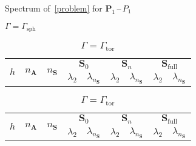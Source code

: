 \documentclass[12pt]{article}
\newcommand{\vect}[1]{\boldsymbol{\mathbf{#1}}}
\newcommand{\sphere}{{\Gamma_{\text{sph}}}}
\newcommand{\tor}{{\Gamma_{\text{tor}}}}
\begin{document}
\begin{table}[h]
	\centering\small
	\caption{Spectrum of~\eqref{problem} for $\vect P_1$\,--\,$P_1$} 
	\label{tab:p1p1}
	\begin{subtable}{1.\linewidth}
		\centering
		\caption{$\Gamma = \sphere$}
		\label{tab:p1p1:sph}
		\begin{tabular}[1.3]{|c|c|c|c|c|c|c|c|c|}
			\hline
			\multirow{2}{*}{$h$} & \multirow{2}{*}{$n_{\vect A}$} & \multirow{2}{*}{$n_{\vect S}$} & \multicolumn{2}{c|}{$\vect S_0$} & \multicolumn{2}{c|}{$\vect S_n$} & \multicolumn{2}{c|}{$\vect S_{\text{full}}$} \\ 
			\cline{4-9}
			& & & $\lambda_2$ & $\lambda_{n_{\vect S}}$ & $\lambda_2$ & $\lambda_{n_{\vect S}}$ & $\lambda_2$ & $\lambda_{n_{\vect S}}$ \\ 
			\hline
			
		\end{tabular}
	\end{subtable}%
	\vskip 3mm
	\begin{subtable}{1.\linewidth}
		\centering
		\caption{$\Gamma = \tor$}
		\label{tab:p1p1:tor}
		\begin{tabular}[1.3]{|c|c|c|c|c|c|c|c|c|}
			\hline
			\multirow{2}{*}{$h$} & \multirow{2}{*}{$n_{\vect A}$} & \multirow{2}{*}{$n_{\vect S}$} & \multicolumn{2}{c|}{$\vect S_0$} & \multicolumn{2}{c|}{$\vect S_n$} & \multicolumn{2}{c|}{$\vect S_{\text{full}}$} \\ 
			\cline{4-9}
			& & & $\lambda_2$ & $\lambda_{n_{\vect S}}$ & $\lambda_2$ & $\lambda_{n_{\vect S}}$ & $\lambda_2$ & $\lambda_{n_{\vect S}}$ \\ 
			\hline
			
		\end{tabular}
	\end{subtable}
\end{table}
\end{document}
